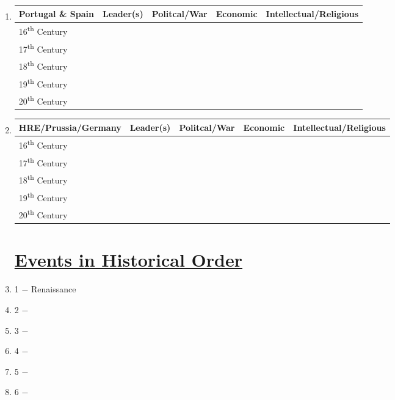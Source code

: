 \documentclass[12pt]{article}
\begin{document}
\begin{enumerate}
\begin{tabular}{l c c c c}
\end{tabular}

\item \begin{tabular}{l c c c c}

Portugal \& Spain & Leader(s) & Politcal/War & Economic & Intellectual/Religious \\
\hline
16\textsuperscript{th} Century & & & & \\
\hline
17\textsuperscript{th} Century & & & & \\
\hline
18\textsuperscript{th} Century & & & & \\
\hline
19\textsuperscript{th} Century & & & & \\
\hline
20\textsuperscript{th} Century & & & & \\

\end{tabular}

\item \begin{tabular}{l c c c c}

HRE/Prussia/Germany & Leader(s) & Politcal/War & Economic & Intellectual/Religious \\
\hline
16\textsuperscript{th} Century & & & & \\
\hline
17\textsuperscript{th} Century & & & & \\
\hline
18\textsuperscript{th} Century & & & & \\
\hline
19\textsuperscript{th} Century & & & & \\
\hline
20\textsuperscript{th} Century & & & & \\

\end{tabular}

\section{\underline{Events in Historical Order}}

\item 1 $-$ Renaissance

\item 2 $-$ 

\item 3 $-$ 

\item 4 $-$ 

\item 5 $-$ 

\item 6 $-$ 


\end{enumerate}
\end{document}
